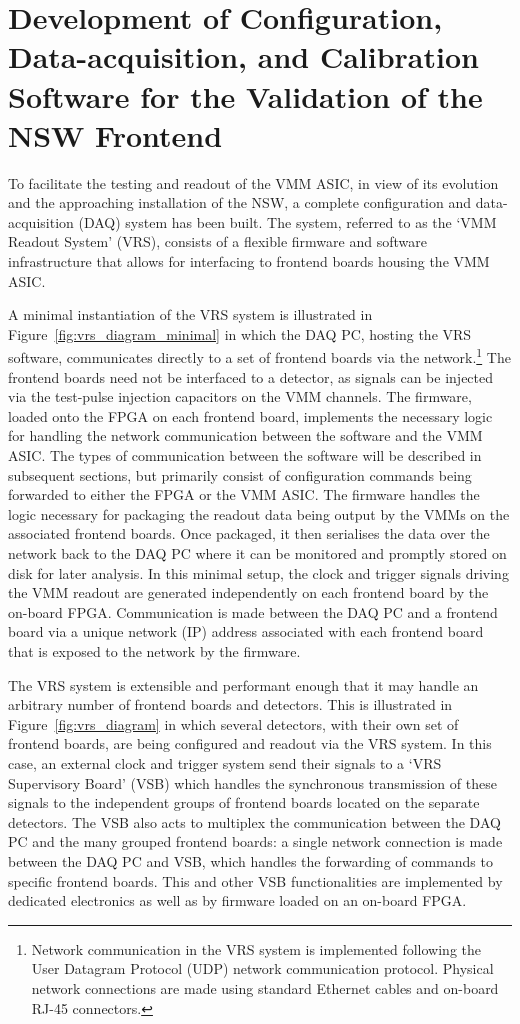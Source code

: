 \section{Development of Configuration, Data-acquisition, and Calibration Software for the Validation of the NSW Frontend}
\label{sec:nsw_vrs}

To facilitate the testing and readout of the VMM ASIC, in view of its evolution
and the approaching installation of the NSW, a complete
configuration and data-acquisition (DAQ) system has been built.
The system, referred to as the `VMM Readout System' (VRS), consists of a flexible
firmware and software infrastructure that allows for
interfacing to frontend boards housing the VMM ASIC.

A minimal instantiation of the VRS system is illustrated in Figure~\ref{fig:vrs_diagram_minimal}
in which the DAQ PC, hosting the VRS software, communicates directly to a set
of frontend boards via the network.\footnote{Network communication in the VRS system is implemented following the User Datagram Protocol (UDP) network
communication protocol. Physical network connections are made using standard Ethernet cables and on-board RJ-45 connectors.}
The frontend boards need not be interfaced to a detector, as signals can be injected via
the test-pulse injection capacitors on the VMM channels.
The firmware, loaded onto the FPGA on each frontend board, implements the necessary logic for handling the network communication
between the software and the VMM ASIC.
The types of communication between the software will be described in subsequent sections, but primarily consist of configuration
commands being forwarded to either the FPGA or the VMM ASIC.
The firmware handles the logic necessary for packaging the readout data being
output by the VMMs on the associated frontend boards.
Once packaged, it then serialises the data over the network back to the DAQ PC where it can be monitored
and promptly stored on disk for later analysis.
In this minimal setup, the clock and trigger signals driving the VMM readout are generated independently
on each frontend board by the on-board FPGA.
Communication is made between the DAQ PC and a frontend board via a unique network (IP)
address associated with each frontend board that is exposed to the network by the firmware. 

The VRS system is extensible and performant enough that it may handle an arbitrary number of frontend boards
and detectors.
This is illustrated in Figure~\ref{fig:vrs_diagram} in which several detectors, with their own
set of frontend boards, are being configured and readout via the VRS system.
In this case, an external clock and trigger system send their signals to a `VRS Supervisory Board' (VSB)
which handles the synchronous transmission of these signals to the independent groups of frontend boards
located on the separate detectors.
The VSB also acts to multiplex the communication between the DAQ PC and the many grouped frontend boards:
a single network connection is made between the DAQ PC and VSB, which handles the forwarding of commands to
specific frontend boards.
This and other VSB functionalities are implemented by dedicated electronics as well as by
firmware loaded on an on-board FPGA.

